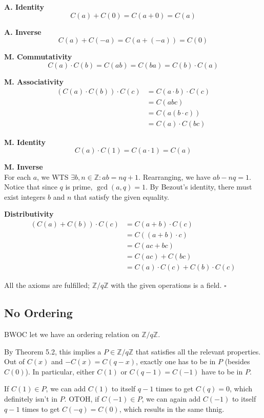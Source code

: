\documentclass[12pt]{article}
\begin{document}
\textbf{A. Identity}
\[C(a)+C(0)=C(a+0)=C(a)\]

\textbf{A. Inverse}
\[C(a)+C(-a)=C(a+(-a))=C(0)\]

\textbf{M. Commutativity}
\[C(a) \cdot C(b)=C(ab)=C(ba)=C(b) \cdot C(a)\]

\textbf{M. Associativity}
\begin{align*}
      (C(a) \cdot C(b)) \cdot C(c)
       & = C(a \cdot b) \cdot C(c) \\
       & = C(abc)                  \\
       & = C(a(b \cdot c))         \\
       & = C(a) \cdot C(bc)
\end{align*}

\textbf{M. Identity}
\[C(a) \cdot C(1)=C(a \cdot 1)=C(a)\]

\textbf{M. Inverse} \\
For each $a$, we WTS $\exists b, n \in \mathbb{Z}: ab=nq+1$.
Rearranging, we have $ab-nq=1$.
Notice that since $q$ is prime, $\gcd(a, q)=1$.
By Bezout's identity, there must exist integers $b$ and $n$
that satisfy the given equality.

\textbf{Distributivity}
\begin{align*}
      (C(a)+C(b)) \cdot C(c)
       & = C(a+b) \cdot C(c)                 \\
       & = C((a+b) \cdot c)                  \\
       & = C(ac+bc)                          \\
       & = C(ac)+C(bc)                       \\
       & = C(a) \cdot C(c) + C(b) \cdot C(c)
\end{align*}

All the axioms are fulfilled;
$\mathbb{Z}/q\mathbb{Z}$ with the given operations is a field. $\square$

\subsection{No Ordering}

BWOC let we have an ordering relation on $\mathbb{Z}/q\mathbb{Z}$.

By Theorem 5.2, this implies a $P \in \mathbb{Z}/q\mathbb{Z}$
that satisfies all the relevant properties.
Out of $C(x)$ and $-C(x)=C(q-x)$, exactly
one has to be in $P$ (besides $C(0)$).
In particular, either $C(1)$ or $C(q-1)=C(-1)$ have to be in $P$.

If $C(1) \in P$, we can add $C(1)$ to itself $q-1$ times to get $C(q)=0$,
which definitely isn't in $P$.
OTOH, if $C(-1) \in P$, we can again add $C(-1)$
to itself $q-1$ times to get $C(-q)=C(0)$, which results in the same thnig.
\end{document}
